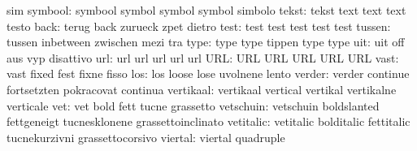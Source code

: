                            sim
                  symbool: symbool                   symbol
                           symbol                    symbol
                           simbolo
                    tekst: tekst                     text
                           text                      text
                           testo
                     back: terug                     back
                           zurueck                   zpet
                           dietro                    %
                     test: test                      test
                           test                      test
                           test
                   tussen: tussen                    inbetween
                           zwischen                  mezi
                           tra
                     type: type                      type
                           tippen                    type
                           type                      %
                      uit: uit                       off
                           aus                       vyp
                           disattivo
                      url: url                       url
                           url                       url
                           url
                      URL: URL                       URL
                           URL                       URL
                           URL
                     vast: vast                      fixed
                           fest                      fixne
                           fisso
                      los: los                       loose
                           lose                      uvolnene
                           lento
                   verder: verder                    continue
                           fortsetzten               pokracovat
                           continua
                vertikaal: vertikaal                 vertical
                           vertikal                  vertikalne
                           verticale
                      vet: vet                       bold
                           fett                      tucne
                           grassetto
                vetschuin: vetschuin                 boldslanted
                           fettgeneigt               tucnesklonene
                           grassettoinclinato
                vetitalic: vetitalic                 bolditalic
                           fettitalic                tucnekurzivni
                           grassettocorsivo
                  viertal: viertal                   quadruple
